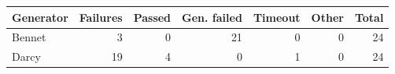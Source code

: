 \begin{tabular}{lrrrrrr}
\toprule
Generator & Failures & Passed & Gen. failed & Timeout & Other & Total\\
\midrule
Bennet & 3 & 0 & 21 & 0 & 0 & 24\\
Darcy & 19 & 4 & 0 & 1 & 0 & 24\\
\bottomrule
\end{tabular}
